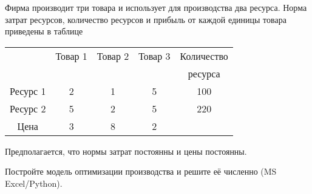 \begin{exercise}
Фирма производит три товара и использует для производства два ресурса.
Норма затрат ресурсов, количество ресурсов и прибыль от каждой единицы
товара приведены в таблице
\begin{center}
\begin{tabular}{|c|c|c|c||c|}
	\hline
	& Товар 1 & Товар 2 & Товар 3 & Количество  \\
	& & & & ресурса \\
	\hline
	Ресурс 1 & 2 & 1 & 5 & 100 \\ \hline
	Ресурс 2 & 5 & 2 & 5 & 220 \\ \hline \hline
	Цена & 3 & 8 & 2 & \\ \hline
\end{tabular}
\end{center}
Предполагается, что нормы затрат постоянны и цены постоянны.

Постройте модель оптимизации производства и решите её численно 
(MS Excel/Python).
\end{exercise}
	


